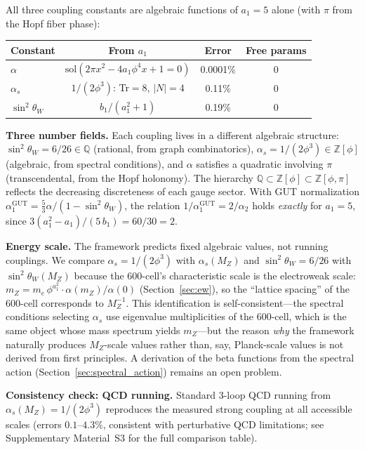 \documentclass[12pt,a4paper]{article}
\theoremstyle{definition}
\begin{document}
All three coupling constants are algebraic functions of $a_1 = 5$ alone (with $\pi$ from the Hopf fiber phase):

\begin{center}
\begin{tabular}{lccc}
\toprule
\textbf{Constant} & \textbf{From $a_1$} & \textbf{Error} & \textbf{Free params} \\
\midrule
$\alpha$ & $\text{sol}(2\pi x^2 - 4a_1\phi^4 x + 1 = 0)$ & 0.0001\% & 0 \\
$\alpha_s$ & $1/(2\phi^3)$: Tr$=8$, $|N|=4$ & 0.11\% & 0 \\
$\sin^2\theta_W$ & $b_1/(a_1^2+1)$ & 0.19\% & 0 \\
\bottomrule
\end{tabular}
\end{center}

\textbf{Three number fields.} Each coupling lives in a different algebraic structure: $\sin^2\theta_W = 6/26 \in \mathbb{Q}$ (rational, from graph combinatorics), $\alpha_s = 1/(2\phi^3) \in \mathbb{Z}[\phi]$ (algebraic, from spectral conditions), and $\alpha$ satisfies a quadratic involving $\pi$ (transcendental, from the Hopf holonomy). The hierarchy $\mathbb{Q} \subset \mathbb{Z}[\phi] \subset \mathbb{Z}[\phi, \pi]$ reflects the decreasing discreteness of each gauge sector. With GUT normalization $\alpha_1^{\text{GUT}} = \tfrac{5}{3}\alpha/(1 - \sin^2\theta_W)$, the relation $1/\alpha_1^{\text{GUT}} = 2/\alpha_2$ holds \emph{exactly} for $a_1 = 5$, since $3(a_1^2 - a_1)/(5\,b_1) = 60/30 = 2$.

\textbf{Energy scale.} The framework predicts fixed algebraic values, not running couplings. We compare $\alpha_s = 1/(2\phi^3)$ with $\alpha_s(M_Z)$ and $\sin^2\theta_W = 6/26$ with $\sin^2\theta_W(M_Z)$ because the 600-cell's characteristic scale is the electroweak scale: $m_Z = m_e\,\phi^{a_1^2} \cdot \alpha(m_Z)/\alpha(0)$ (Section~\ref{sec:ew}), so the ``lattice spacing'' of the 600-cell corresponds to $M_Z^{-1}$. This identification is self-consistent---the spectral conditions selecting $\alpha_s$ use eigenvalue multiplicities of the 600-cell, which is the same object whose mass spectrum yields $m_Z$---but the reason \emph{why} the framework naturally produces $M_Z$-scale values rather than, say, Planck-scale values is not derived from first principles. A derivation of the beta functions from the spectral action (Section~\ref{sec:spectral_action}) remains an open problem.

\textbf{Consistency check: QCD running.} Standard 3-loop QCD running from $\alpha_s(M_Z) = 1/(2\phi^3)$ reproduces the measured strong coupling at all accessible scales (errors $0.1$--$4.3\%$, consistent with perturbative QCD limitations; see Supplementary Material~S3 for the full comparison table).
\end{document}

